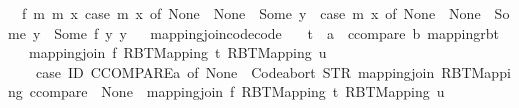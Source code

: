 \begin{isabellebody}
\ \ {\isachardoublequoteopen}{\isasymlambda}f\ m\ m{\isacharprime}{\kern0pt}\ x{\isachardot}{\kern0pt}\ case\ m\ x\ of\ None\ {\isasymRightarrow}\ None\ {\isacharbar}{\kern0pt}\ Some\ y\ {\isasymRightarrow}\ {\isacharparenleft}{\kern0pt}case\ m{\isacharprime}{\kern0pt}\ x\ of\ None\ {\isasymRightarrow}\ None\ {\isacharbar}{\kern0pt}\ Some\ y{\isacharprime}{\kern0pt}\ {\isasymRightarrow}\ Some\ {\isacharparenleft}{\kern0pt}f\ y\ y{\isacharprime}{\kern0pt}{\isacharparenright}{\kern0pt}{\isacharparenright}{\kern0pt}{\isachardoublequoteclose}%
\isadelimproof
\ %
\endisadelimproof
%
\isatagproof
\isacommand{{\isachardot}{\kern0pt}}\isamarkupfalse%
%
\endisatagproof
{\isafoldproof}%
%
\isadelimproof
%
\endisadelimproof
\isanewline
\isanewline
{}\isamarkupfalse%
\ mapping{\isacharunderscore}{\kern0pt}join{\isacharunderscore}{\kern0pt}code{\isacharbrackleft}{\kern0pt}code{\isacharbrackright}{\kern0pt}{\isacharcolon}{\kern0pt}\isanewline
\ \ \ t\ {\isacharcolon}{\kern0pt}{\isacharcolon}{\kern0pt}\ {\isachardoublequoteopen}{\isacharparenleft}{\kern0pt}{\isacharprime}{\kern0pt}a\ {\isacharcolon}{\kern0pt}{\isacharcolon}{\kern0pt}\ ccompare{\isacharcomma}{\kern0pt}\ {\isacharprime}{\kern0pt}b{\isacharparenright}{\kern0pt}\ mapping{\isacharunderscore}{\kern0pt}rbt{\isachardoublequoteclose}\isanewline
\ \ \ {\isachardoublequoteopen}mapping{\isacharunderscore}{\kern0pt}join\ f\ {\isacharparenleft}{\kern0pt}RBT{\isacharunderscore}{\kern0pt}Mapping\ t{\isacharparenright}{\kern0pt}\ {\isacharparenleft}{\kern0pt}RBT{\isacharunderscore}{\kern0pt}Mapping\ u{\isacharparenright}{\kern0pt}\ {\isacharequal}{\kern0pt}\isanewline
\ \ \ \ {\isacharparenleft}{\kern0pt}case\ ID\ CCOMPARE{\isacharparenleft}{\kern0pt}{\isacharprime}{\kern0pt}a{\isacharparenright}{\kern0pt}\ of\ None\ {\isasymRightarrow}\ Code{\isachardot}{\kern0pt}abort\ {\isacharparenleft}{\kern0pt}STR\ {\isacharprime}{\kern0pt}{\isacharprime}{\kern0pt}mapping{\isacharunderscore}{\kern0pt}join\ RBT{\isacharunderscore}{\kern0pt}Mapping{\isacharcolon}{\kern0pt}\ ccompare\ {\isacharequal}{\kern0pt}\ None{\isacharprime}{\kern0pt}{\isacharprime}{\kern0pt}{\isacharparenright}{\kern0pt}\ {\isacharparenleft}{\kern0pt}{\isasymlambda}{\isacharunderscore}{\kern0pt}{\isachardot}{\kern0pt}\ mapping{\isacharunderscore}{\kern0pt}join\ f\ {\isacharparenleft}{\kern0pt}RBT{\isacharunderscore}{\kern0pt}Mapping\ t{\isacharparenright}{\kern0pt}\ {\isacharparenleft}{\kern0pt}RBT{\isacharunderscore}{\kern0pt}Mapping\ u{\isacharparenright}{\kern0pt}{\isacharparenright}{\kern0pt}\isanewline

\end{isabellebody}
